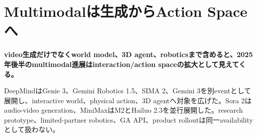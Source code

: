 \section{Multimodalは生成からAction Spaceへ}
\noindent\textbf{video生成だけでなくworld model、3D agent、roboticsまで含めると、2025年後半のmultimodal進展はinteraction/action spaceの拡大として見えてくる。}\autocite{src-dd5d9b8662f3}

DeepMindはGenie 3、Gemini Robotics 1.5、SIMA 2、Gemini 3を別eventとして展開し、interactive world、physical action、3D agentへ対象を広げた。Sora 2はaudio-video generation、MiniMaxはM2とHailuo 2.3を並行展開した。research prototype、limited-partner robotics、GA API、product rolloutは同一availabilityとして扱わない。\autocite{src-661a3476d3d5,src-8530f5b0e216,src-d8e13386974c,src-dd5d9b8662f3}
